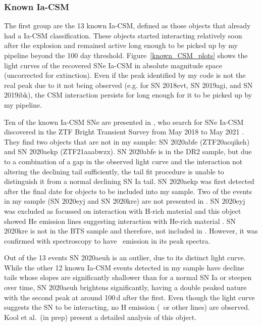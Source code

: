 \documentclass[a4paper,oneside,12pt, class=Latex/Classes/PhDthesisPSnPDF, crop=false]{standalone}
\begin{document}
\subsubsection{Known Ia-CSM}
\label{known-iacsm}
The first group are the 13 known Ia-CSM, defined as those objects that already had a Ia-CSM classification. These objects started interacting relatively soon after the explosion and remained active long enough to be picked up by my pipeline beyond the 100 day threshold. Figure~\ref{known_CSM_plots} shows the light curves of the recovered SNe Ia-CSM in absolute magnitude space (uncorrected for extinction). Even if the peak identified by my code is not the real peak due to it not being observed (e.g. for SN 2018evt, SN 2019agi, and SN 2019ibk), the CSM interaction persists for long enough for it to be picked up by my pipeline.

Ten of the known Ia-CSM SNe are presented in \citet{Ia-CSM_BTS}, who search for SNe Ia-CSM discovered in the ZTF Bright Transient Survey from May 2018 to May 2021 \cite[BTS;][]{BTS_I, BTS_II}. They find two objects that are not in my sample: SN 2020abfe (ZTF20acqikeh) and SN 2020aekp (ZTF21aaabwzx). SN 2020abfe is in the DR2 sample, but due to a combination of a gap in the observed light curve and the interaction not altering the declining tail sufficiently, the tail fit procedure is unable to distinguish it from a normal declining SN Ia tail. SN 2020aekp was first detected after the final date for objects to be included into my sample. Two of the events in my sample (SN 2020eyj and SN 2020kre) are not presented in \citet{Ia-CSM_BTS}. SN 2020eyj was excluded as \citet{Ia-CSM_BTS} focussed on interaction with H-rich material and this object showed He emission lines suggesting interaction with He-rich material \citep{Kool_He_CSM}. SN 2020kre is not in the BTS sample and therefore, not included in \cite{Ia-CSM_BTS}. However, it was confirmed with spectroscopy to have \Halpha~emission in its peak spectra.

Out of the 13 events SN 2020aeuh is an outlier, due to its distinct light curve. While the other 12 known Ia-CSM events detected in my sample have decline tails whose slopes are significantly shallower than for a normal SN Ia or steepen over time, SN 2020aeuh brightens significantly, having a double peaked nature with the second peak at around 100\,d after the first. Even though the light curve suggests the SN to be interacting, no H emission (\Halpha~or other lines) are observed. Kool et al.~(in prep) present a detailed analysis of this object. 
\end{document}
